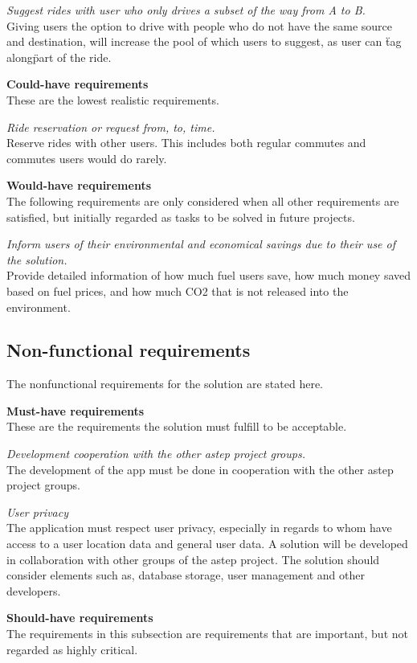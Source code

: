 \textit{Suggest rides with user who only drives a subset of the way from A to B.}\\
Giving users the option to drive with people who do not have the same source and destination, will increase the pool of which users to suggest, as user can \"tag along\" part of the ride.


\textbf{Could-have requirements}\\
These are the lowest realistic requirements. 

\textit{Ride reservation or request from, to, time.}\\
Reserve rides with other users. 
This includes both regular commutes and commutes users would do rarely.

\textbf{Would-have requirements}\\
The following requirements are only considered when all other requirements are satisfied, but initially regarded as tasks to be solved in future projects.

\textit{Inform users of their environmental and economical savings due to their use of the solution.}\\
Provide detailed information of how much fuel users save, how much money saved based on fuel prices, and how much CO2 that is not released into the environment. 

\subsection{Non-functional requirements}
The nonfunctional requirements for the solution are stated here.

\textbf{Must-have requirements}\\
These are the requirements the solution must fulfill to be acceptable.

\textit{Development cooperation with the other \gls{astep} project groups.}\\
The development of the app must be done in cooperation with the other \gls{astep} project groups.

\textit{User privacy}\\
The application must respect user privacy, especially in regards  to whom have access to a user location data and general user data.
A solution will be developed in collaboration with other groups of the \gls{astep} project. The solution should consider elements such as, database storage, user management and other developers.

\textbf{Should-have requirements}\\
The requirements in this subsection are requirements that are important, but not regarded as highly critical.

